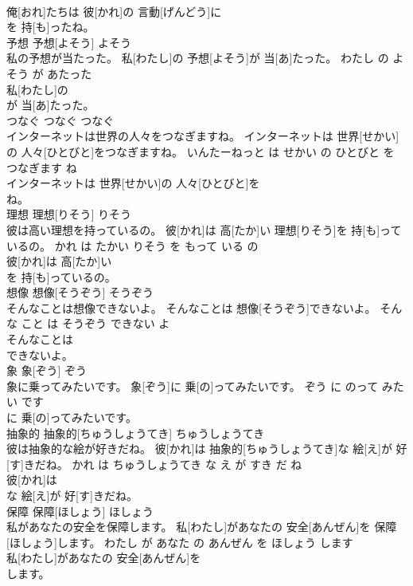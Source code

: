 \documentclass[8pt]{extreport}
\begin{document}
\begin{CJK}{UTF8}{min}
\\	俺[おれ]たちは 彼[かれ]の 言動[げんどう]に
\\	を 持[も]ったね。			
\\	予想	予想[よそう]	よそう	
\\	私の予想が当たった。	私[わたし]の 予想[よそう]が 当[あ]たった。	わたし の よそう が あたった	
\\	私[わたし]の
\\	が 当[あ]たった。			
\\	つなぐ	つなぐ	つなぐ	
\\	インターネットは世界の人々をつなぎますね。	インターネットは 世界[せかい]の 人々[ひとびと]をつなぎますね。	いんたーねっと は せかい の ひとびと を つなぎます ね	
\\	インターネットは 世界[せかい]の 人々[ひとびと]を
\\	ね。			
\\	理想	理想[りそう]	りそう	
\\	彼は高い理想を持っているの。	彼[かれ]は 高[たか]い 理想[りそう]を 持[も]っているの。	かれ は たかい りそう を もって いる の	
\\	彼[かれ]は 高[たか]い
\\	を 持[も]っているの。			
\\	想像	想像[そうぞう]	そうぞう	
\\	そんなことは想像できないよ。	そんなことは 想像[そうぞう]できないよ。	そんな こと は そうぞう できない よ	
\\	そんなことは
\\	できないよ。			
\\	象	象[ぞう]	ぞう	
\\	象に乗ってみたいです。	象[ぞう]に 乗[の]ってみたいです。	ぞう に のって みたい です	
\\	に 乗[の]ってみたいです。			
\\	抽象的	抽象的[ちゅうしょうてき]	ちゅうしょうてき	
\\	彼は抽象的な絵が好きだね。	彼[かれ]は 抽象的[ちゅうしょうてき]な 絵[え]が 好[す]きだね。	かれ は ちゅうしょうてき な え が すき だ ね	
\\	彼[かれ]は
\\	な 絵[え]が 好[す]きだね。			
\\	保障	保障[ほしょう]	ほしょう	
\\	私があなたの安全を保障します。	私[わたし]があなたの 安全[あんぜん]を 保障[ほしょう]します。	わたし が あなた の あんぜん を ほしょう します	
\\	私[わたし]があなたの 安全[あんぜん]を
\\	します。			

\end{CJK}
\end{document}
